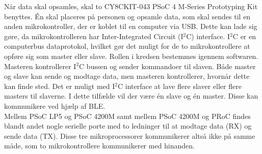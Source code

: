 Når data skal opsamles, skal to CY8CKIT-043 PSoC 4 M-Series Prototyping Kit benyttes. Én skal placeres på personen og opsamle data, som skal sendes til en anden mikrokontroller, der er koblet til en computer via USB. Dette kan lade sig gøre, da mikrokontrolleren har Inter-Integrated Circuit (I$^{2}$C) interface. I$^{2}$C er en computerbus dataprotokol, hvilket gør det muligt for de to mikrokontrollere at opføre sig som master eller slave. Rollen i kredsen bestemmes igennem softwaren. Masteren kontrollerer I$^{2}$C bussen og sender kommandoer til slaven. Både master og slave kan sende og modtage data, men masteren kontrollerer, hvornår dette kan finde sted. Det er muligt med I$^{2}$C interface at lave flere slaver eller flere masters til slaverne. I dette tilfælde vil der være én slave og én master. Disse kan kommunikere ved hjælp af BLE. \citep{Semiconductor2016,Sparkfun2016}\\
Mellem PSoC LP5 og PSoC 4200M samt mellem PSoC 4200M og PRoC findes blandt andet nogle serielle porte med to ledninger til at modtage data (RX) og sende data (TX). Disse tre mikroprocessorer kommunikerer altså ikke på samme måde, som to mikrokontrollere kommunikerer med hinanden. 
%
%
